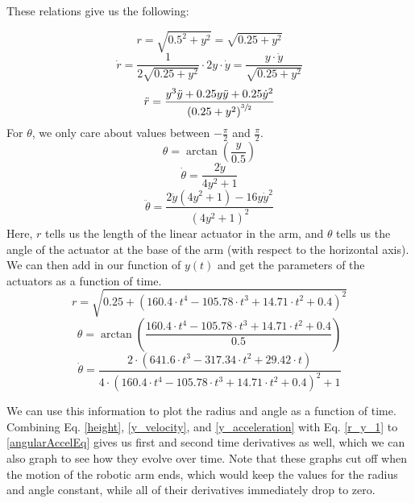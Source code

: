 \documentclass[nofoot,pdf-a,balance,colorlinks,upint,subscriptcorrection,varvw,mathalfa=cal=boondoxo]{asmeconf}
\begin{document}
    These relations give us the following:

    \begin{equation}\label{r_y_1}
        r = \sqrt{0.5^2+y^2} = \sqrt{0.25 + y^2}
	\end{equation}
    \begin{equation}
        \dot{r} = \frac{1}{2\sqrt{0.25+y^2}}\cdot2y\cdot\dot{y} = \frac{ y\cdot\dot{y}}{\sqrt{0.25+y^2}}
	\end{equation}
    \begin{equation}
        \ddot{r} = \frac{y^3 \ddot{y} + 0.25 y\ddot{y} + 0.25\dot{y}^2}{{\left(0.25 + y^2\right)}^{\sfrac{3}{2}}}
	\end{equation}
    For $\theta$, we only care about values between $-\frac{\pi}{2}$ and $\frac{\pi}{2}$.
    \begin{equation}
        \theta = \arctan{\left(\frac{y}{0.5}\right)}
	\end{equation}
    \begin{equation}
        \dot{\theta} = \frac{2\dot{y}}{4y^2 + 1}
	\end{equation}
    \begin{equation}\label{angularAccelEq}
        \ddot{\theta} = \frac{2\ddot{y}\left(4y^2+1\right) - 16y\dot{y}^2}{{\left(4y^2 + 1\right)}^2}
	\end{equation}
    Here, $r$ tells us the length of the linear actuator in the arm, and $\theta$ tells us the angle of the actuator at the base of the arm (with respect to the horizontal axis). We can then add in our function of $y\left(t\right)$ and get the parameters of the actuators as a function of time. 
	\begin{equation}
	r = \sqrt{0.25+\left( 160.4 \cdot t^4 - 105.78 \cdot t^3 + 14.71 \cdot t^2 + 0.4\right)^2}
	\end{equation}
	\begin{equation}
        \theta = \arctan{\left(\frac{160.4 \cdot t^4 - 105.78 \cdot t^3 + 14.71 \cdot t^2 + 0.4}{0.5}\right)}
	\end{equation}
	\begin{equation}
	    \dot{\theta} =\frac{2\cdot\left(641.6\cdot t^3 - 317.34\cdot t^2 + 29.42\cdot t\right)}{4\cdot\left(160.4 \cdot t^4 - 105.78 \cdot t^3 + 14.71 \cdot t^2 + 0.4\right)^2+1}
	\end{equation}

    We can use this information to plot the radius and angle as a function of time. Combining Eq. \eqref{height}, \eqref{y_velocity}, and \eqref{y_acceleration} with Eq. \eqref{r_y_1} to \eqref{angularAccelEq} gives us first and second time derivatives as well, which we can also graph to see how they evolve over time. Note that these graphs cut off when the motion of the robotic arm ends, which would keep the values for the radius and angle constant, while all of their derivatives immediately drop to zero.
\end{document}
